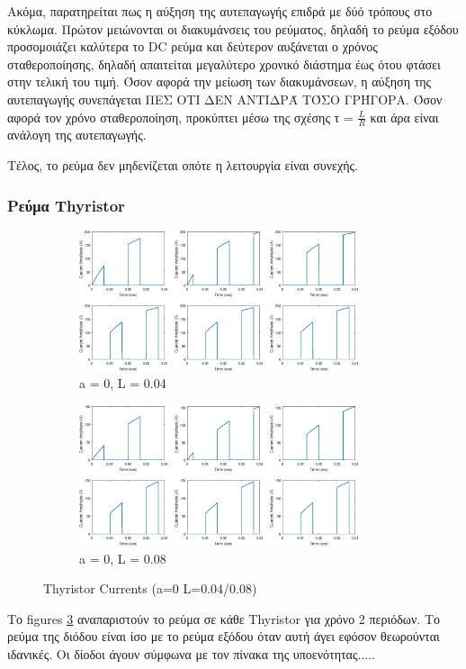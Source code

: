 Ακόμα, παρατηρείται πως η αύξηση της αυτεπαγωγής επιδρά με δύό τρόπους στο κύκλωμα. Πρώτον μειώνονται οι διακυμάνσεις του ρεύματος, δηλαδή το ρεύμα εξόδου προσομοιάζει καλύτερα το DC ρεύμα και δεύτερον αυξάνεται ο χρόνος σταθεροποίησης, δηλαδή απαιτείται μεγαλύτερο χρονικό διάστημα έως ότου φτάσει στην τελική του τιμή. Όσον αφορά την μείωση των διακυμάνσεων, η αύξηση της αυτεπαγωγής συνεπάγεται ΠΕΣ ΟΤΙ ΔΕΝ ΑΝΤΙΔΡΆ ΤΌΣΟ ΓΡΉΓΟΡΑ. Όσον αφορά τον χρόνο σταθεροποίηση, προκύπτει μέσω της σχέσης τ = $\frac{L}{R}$ και άρα είναι ανάλογη της αυτεπαγωγής.

Τέλος, το ρεύμα δεν μηδενίζεται οπότε η λειτουργία είναι συνεχής.


\subsubsection{Ρεύμα Thyristor}
\begin{figure}[h]
	\centering
	\begin{subfigure}{.5\textwidth}
		\centering
		\includegraphics[width =0.9\textwidth]{Images/3_ThI_0_04}
		\caption{a = 0, L = 0.04}
		\label{fig:3_ThI_0_04}
	\end{subfigure}%
	\begin{subfigure}{.5\textwidth}
		\centering
		\includegraphics[width = 0.9\textwidth]{Images/3_ThI_0_08}
		\caption{a = 0, L = 0.08}
		\label{fig:3_ThI_0_08}
	\end{subfigure}
	\caption{Thyristor Currents (a=0 L=0.04/0.08)}
	\label{figs:3_ThI_0}
\end{figure}

Το figures \ref{figs:3_ThI_0} αναπαριστούν το ρεύμα σε κάθε Thyristor για χρόνο 2 περιόδων. Το ρεύμα της διόδου είναι ίσο με το ρεύμα εξόδου όταν αυτή άγει εφόσον θεωρούνται ιδανικές. Οι δίοδοι άγουν σύμφωνα με τον πίνακα της υποενότητας.....
